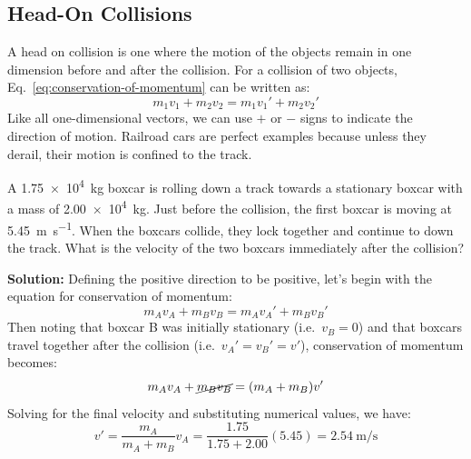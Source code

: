 
\subsection{Head-On Collisions}
A head on collision is one where the motion of the objects remain in
one dimension before and after the collision. For a collision of two objects,
Eq.~\ref{eq:conservation-of-momentum} can be written as:
\begin{equation}
  m_1v_1+m_2v_2=m_1v_1'+m_2v_2'
\end{equation}
Like all one-dimensional vectors, we can use $+$ or $-$ signs to indicate the
direction of motion. Railroad cars are perfect examples because unless they
derail, their motion is confined to the track.

\begin{example}
  A \SI{1.75e4}{\kilo\gram} boxcar is rolling down a track towards a stationary
  boxcar with a mass of \SI{2.00e4}{\kilo\gram}. Just before the collision,
  the first boxcar is moving at \SI{5.45}{\metre\per\second}. When the
  boxcars collide, they lock together and continue to down the track. What is
  the velocity of the two boxcars immediately after the collision?
  \begin{center}
  \end{center}
  \textbf{Solution:} Defining the positive direction to be positive, let's
  begin with the equation for conservation of momentum:
  \begin{equation*}
    m_Av_A+m_Bv_B=m_Av_A'+m_Bv_B'
  \end{equation*}
  Then noting that boxcar B was initially stationary (i.e.\ $v_B=0$) and that
  boxcars travel together after the collision (i.e.\ $v_A'=v_B'=v'$),
  conservation of momentum becomes:
  \begin{equation*}
    m_Av_A+\cancel{m_Bv_B}=(m_A+m_B)v'
  \end{equation*}
  Solving for the final velocity and substituting numerical values, we have:
  \begin{equation*}
    v'=\frac{m_A}{m_A+m_B}v_A=\frac{1.75}{1.75+2.00}(5.45)=
    \boxed{\SI{2.54}{\metre\per\second}}
  \end{equation*}
\end{example}


